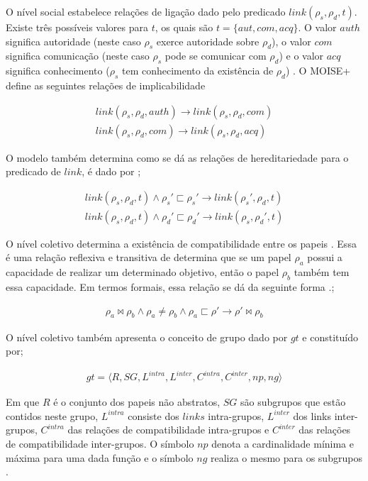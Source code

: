 O nível social estabelece relações de ligação dado pelo predicado $link(\rho_s,\rho_d,t)$. Existe três possíveis valores para $t$, os quais são $t = \{aut, com, acq\}$. O valor $auth$ significa 
autoridade (neste caso $\rho_s$ exerce autoridade sobre $\rho_d$), o valor $com$ significa comunicação (neste caso $\rho_s$ pode se comunicar com $\rho_d$) e o valor $acq$ significa conhecimento 
($\rho_s$ tem conhecimento da existência de $\rho_d$) \cite{mosieframework}. O MOISE+ define as seguintes relações de implicabilidade

\begin{eqnarray}\nonumber
	link(\rho_s,\rho_d,auth) \to link(\rho_s,\rho_d,com) \nonumber \\
	link(\rho_s,\rho_d,com) \to link(\rho_s,\rho_d,acq) 
\end{eqnarray}

O modelo também determina como se dá as relações de hereditariedade para o predicado de $link$, é dado por \cite{mosieframework}; 

\begin{eqnarray}\nonumber
	link(\rho_s,\rho_d,t) \wedge \rho_s' \sqsubset \rho_s' \to link(\rho_s',\rho_d,t) \nonumber \\
	link(\rho_s,\rho_d,t) \wedge \rho_d' \sqsubset \rho_d' \to link(\rho_s,\rho_d',t) 	
\end{eqnarray}


O nível coletivo determina a existência de compatibilidade entre os papeis \cite{mosieframework}. Essa é uma relação reflexiva e transitiva de determina que se um papel $\rho_a$ possui a 
capacidade de realizar um determinado objetivo, então o papel $\rho_b$ também tem essa capacidade. Em termos formais, essa relação se dá da seguinte forma \cite{mosieframework}.;

\begin{eqnarray}\nonumber
	\rho_a \bowtie \rho_b \wedge \rho_a \neq \rho_b \wedge \rho_a \sqsubset \rho' \to \rho' \bowtie \rho_b 
\end{eqnarray}

O nível coletivo também apresenta o conceito de grupo dado por $gt$ e constituído por;

\begin{eqnarray}\nonumber
	gt = \langle R,SG,L^{intra},L^{inter},C^{intra},C^{inter},np,ng\rangle 
\end{eqnarray}

Em que $R$ é o conjunto dos papeis não abstratos, $SG$ são subgrupos que estão contidos neste grupo, $L^{intra}$ consiste dos $links$ intra-grupos, $L^{inter}$ dos links inter-grupos, $C^{intra}$ das relações de compatibilidade intra-grupos e $C^{inter}$ das relações de compatibilidade inter-grupos. O símbolo $np$ denota a cardinalidade mínima e máxima para uma dada função e o símbolo $ng$ realiza o mesmo para os subgrupos \cite{mosieframework}. 

